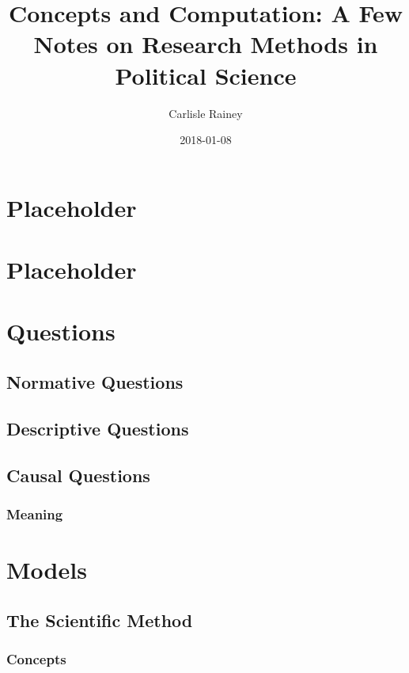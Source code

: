 \documentclass[]{book}
\title{Concepts and Computation: A Few Notes on Research Methods in Political
Science}
\author{Carlisle Rainey}
\date{2018-01-08}
\theoremstyle{definition}
\theoremstyle{definition}
\theoremstyle{definition}
\theoremstyle{remark}
\begin{document}
\maketitle

{
\setcounter{tocdepth}{1}
\tableofcontents
}
\chapter{Placeholder}\label{placeholder}

\chapter{Placeholder}\label{placeholder-1}

\chapter{Questions}\label{questions}

\section{Normative Questions}\label{normative-questions}

\section{Descriptive Questions}\label{descriptive-questions}

\section{Causal Questions}\label{causal-questions}

\subsection{Meaning}\label{meaning}

\chapter{Models}\label{models}

\section{The Scientific Method}\label{the-scientific-method}

\subsection{Concepts}\label{concepts}
\end{document}
